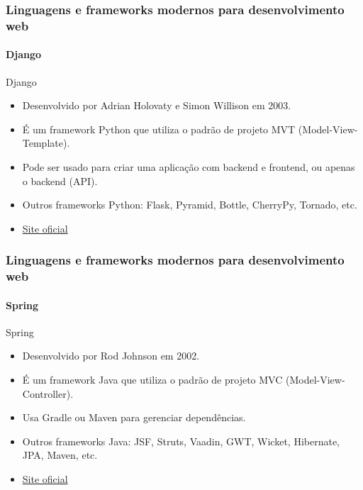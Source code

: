 \documentclass[
	9pt, %
	t, %
]{beamer}
\newcommand{\iconLink}[2]{\href{#1}{\faLink \hspace{0.2em} {#2}}}
\begin{document}
\begin{frame}
	\frametitle{Linguagens e frameworks modernos para desenvolvimento web}
	\framesubtitle{Django}

	\begin{block}{Django}
		\begin{itemize}
			\item Desenvolvido por Adrian Holovaty e Simon Willison em 2003. 
			\item É um framework Python que utiliza o padrão de projeto MVT (Model-View-Template).
			\item Pode ser usado para criar uma aplicação com backend e frontend, ou apenas o backend (API).
			\item Outros frameworks Python: Flask, Pyramid, Bottle, CherryPy, Tornado, etc.
			\item \iconLink{https://www.djangoproject.com/}{Site oficial}
		\end{itemize}
	\end{block}

\end{frame}

\begin{frame}
	\frametitle{Linguagens e frameworks modernos para desenvolvimento web}
	\framesubtitle{Spring}

	\begin{block}{Spring}
		\begin{itemize}
			\item Desenvolvido por Rod Johnson em 2002. 
			\item É um framework Java que utiliza o padrão de projeto MVC (Model-View-Controller).
			\item Usa Gradle ou Maven para gerenciar dependências.
			\item Outros frameworks Java: JSF, Struts, Vaadin, GWT, Wicket, Hibernate, JPA, Maven, etc.
			\item \iconLink{https://spring.io/}{Site oficial}
		\end{itemize}
	\end{block}

\end{frame}
\end{document}
